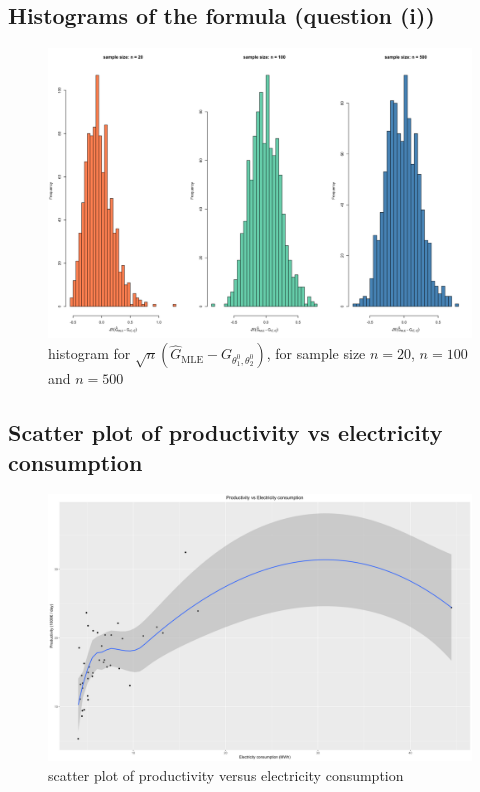 \subsection{Histograms of the formula (question (i))}

\begin{figure}[H]
  \centering
  \includegraphics[width=\textwidth]{figures/png/special_formula_comparison.png}
  \caption{histogram for $\sqrt{n}(\hat{G}_{\text{MLE}} - G_{\theta_1^0, \theta_2^0})$, for sample size $n = 20$, $n = 100$ and $n = 500$}
  \label{fig:special-formula-sample-size-comparison}
\end{figure}

\subsection{Scatter plot of productivity vs electricity consumption}

\begin{figure}[H]
  \centering
  \includegraphics[width=\textwidth]{figures/png/lm_scatter_plot.png}
  \caption{scatter plot of productivity versus electricity consumption}
  \label{fig:scatter_plot}
\end{figure}

